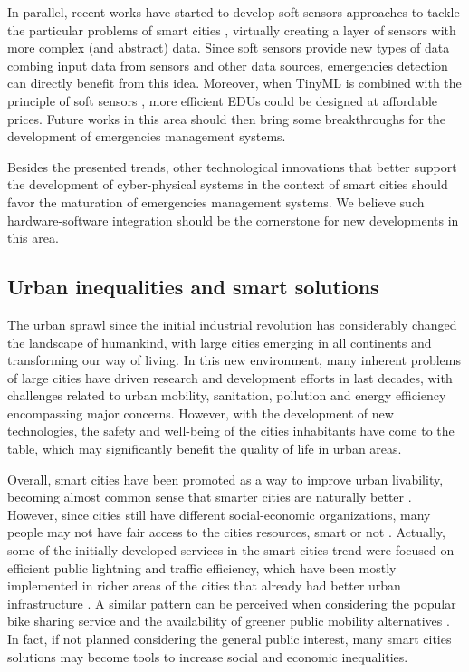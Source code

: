 \begin{refsection}
In parallel, recent works have started to develop soft sensors approaches to tackle the particular problems of smart cities \cite{softsensor,softsensor3}, virtually creating a layer of sensors with more complex (and abstract) data. Since soft sensors provide new types of data combing input data from sensors and other data sources, emergencies detection can directly benefit from this idea. Moreover, when TinyML is combined with the principle of soft sensors \cite{softsensor2}, more efficient EDUs could be designed at affordable prices. Future works in this area should then bring some breakthroughs for the development of emergencies management systems.

Besides the presented trends, other technological innovations that better support the development of cyber-physical systems in the context of smart cities should favor the maturation of emergencies management systems. We believe such hardware-software integration should be the cornerstone for new developments in this area.

\subsection{Urban inequalities and smart solutions}

The urban sprawl since the initial industrial revolution has considerably changed the landscape of humankind, with large cities emerging in all continents and transforming our way of living. In this new environment, many inherent problems of large cities have driven research and development efforts in last decades, with challenges related to urban mobility, sanitation, pollution and energy efficiency encompassing major concerns. However, with the development of new technologies, the safety and well-being of the cities inhabitants have come to the table, which may significantly benefit the quality of life in urban areas.

Overall, smart cities have been promoted as a way to improve urban livability, becoming almost common sense that smarter cities are naturally better \cite{citylife}. However, since cities still have different social-economic organizations, many people may not have fair access to the cities resources, smart or not \cite{inequalities1}. Actually, some of the initially developed services in the smart cities trend were focused on efficient public lightning and traffic efficiency, which have been mostly implemented in richer areas of the cities that already had better urban infrastructure \cite{inequalities3}. A similar pattern can be perceived when considering the popular bike sharing service and the availability of greener public mobility alternatives \cite{smartcycling}. In fact, if not planned considering the general public interest, many smart cities solutions may become tools to increase social and economic inequalities. 


\end{refsection}
